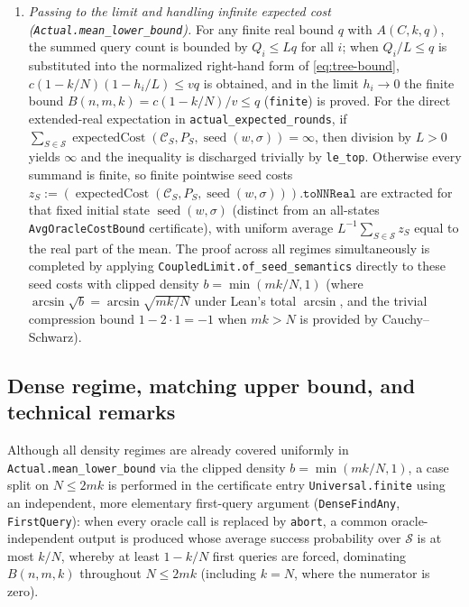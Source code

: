 \documentclass[11pt,a4paper]{article}
\theoremstyle{definition}
\theoremstyle{remark}
\begin{document}
\begin{enumerate}
\item \emph{Passing to the limit and handling infinite expected cost (\texttt{Actual.mean\_lower\_bound}).} For any finite real bound \(q\) with \(A(C,k,q)\), the summed query count is bounded by \(Q_i \le L q\) for all \(i\); when \(Q_i / L \le q\) is substituted into the normalized right-hand form of \eqref{eq:tree-bound}, \(c(1 - k/N)(1 - h_i/L) \le v q\) is obtained, and in the limit \(h_i \to 0\) the finite bound \(B(n,m,k) = c(1 - k/N)/v \le q\) (\texttt{finite}) is proved. For the direct extended-real expectation in \texttt{actual\_expected\_rounds}, if \(\sum_{S \in \mathcal{S}} \operatorname{expectedCost}(\mathcal{C}_S, P_S, \operatorname{seed}(w,\sigma)) = \infty\), then division by \(L > 0\) yields \(\infty\) and the inequality is discharged trivially by \texttt{le\_top}. Otherwise every summand is finite, so finite pointwise seed costs \(z_S := (\operatorname{expectedCost}(\mathcal{C}_S, P_S, \operatorname{seed}(w,\sigma))).\texttt{toNNReal}\) are extracted for that fixed initial state \(\operatorname{seed}(w,\sigma)\) (distinct from an all-states \texttt{AvgOracleCostBound} certificate), with uniform average \(L^{-1}\sum_{S \in \mathcal{S}} z_S\) equal to the real part of the mean. The proof across all regimes simultaneously is completed by applying \texttt{CoupledLimit.of\_seed\_semantics} directly to these seed costs with clipped density \(b = \min(mk/N, 1)\) (where \(\arcsin\sqrt{b} = \arcsin\sqrt{mk/N}\) under Lean's total \(\arcsin\), and the trivial compression bound \(1 - 2\cdot 1 = -1\) when \(mk > N\) is provided by Cauchy--Schwarz).
\end{enumerate}

\subsection{Dense regime, matching upper bound, and technical remarks}
\label{sec:findany-tight}

Although all density regimes are already covered uniformly in \texttt{Actual.mean\_lower\_bound} via the clipped density \(b = \min(mk/N, 1)\), a case split on \(N \le 2mk\) is performed in the certificate entry \texttt{Universal.finite} using an independent, more elementary first-query argument (\texttt{DenseFindAny}, \texttt{FirstQuery}): when every oracle call is replaced by \texttt{abort}, a common oracle-independent output is produced whose average success probability over \(\mathcal{S}\) is at most \(k/N\), whereby at least \(1 - k/N\) first queries are forced, dominating \(B(n,m,k)\) throughout \(N \le 2mk\) (including \(k = N\), where the numerator is zero).
\end{document}
